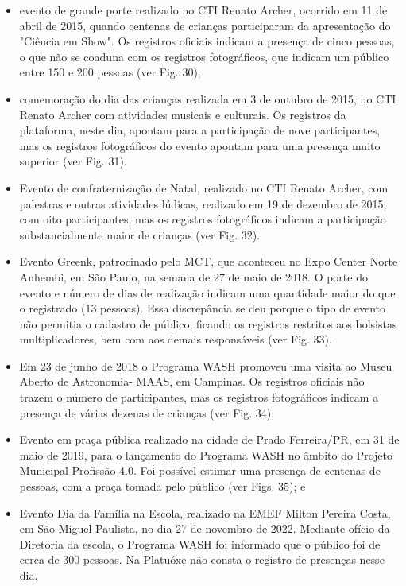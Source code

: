 \begin{itemize}
\item evento de grande porte realizado no CTI Renato Archer, ocorrido em 11 de abril de 2015, quando centenas de crianças participaram da apresentação do "Ciência em Show". Os registros oficiais indicam a presença de cinco pessoas, o que não se coaduna com os registros fotográficos, que indicam um público entre 150 e 200 pessoas (ver Fig. 30);
\item comemoração do dia das crianças realizada em 3 de outubro de 2015, no CTI Renato Archer com atividades musicais e culturais. Os registros da plataforma, neste dia, apontam para a participação de nove participantes, mas os registros fotográficos do evento apontam para uma presença muito superior (ver Fig. 31).
\item Evento de confraternização de Natal, realizado no CTI Renato Archer, com palestras e outras atividades lúdicas, realizado em 19 de dezembro de 2015, com oito participantes, mas os registros fotográficos indicam a participação substancialmente maior de crianças (ver Fig. 32).
\item Evento Greenk, patrocinado pelo MCT, que aconteceu no Expo Center Norte Anhembi, em São Paulo, na semana de 27 de maio de 2018. O porte do evento e número de dias de realização indicam uma quantidade  maior do que o registrado (13 pessoas). Essa discrepância se deu porque o tipo de evento não permitia o cadastro de público, ficando os registros restritos aos bolsistas multiplicadores, bem com aos demais responsáveis (ver Fig. 33).
\item Em 23 de junho de 2018 o Programa WASH promoveu uma visita ao Museu Aberto de Astronomia- MAAS, em Campinas. Os registros oficiais não trazem o número de participantes, mas os registros fotográficos indicam a presença de várias dezenas de crianças (ver Fig. 34);
\item Evento em praça pública realizado na cidade de Prado Ferreira/PR, em 31 de maio de 2019, para o lançamento do Programa WASH no âmbito do Projeto Municipal Profissão 4.0. Foi possível estimar uma presença de centenas de pessoas, com a praça tomada pelo público (ver Figs. 35); e
\item Evento Dia da Família na Escola, realizado na EMEF Milton Pereira Costa, em São Miguel Paulista, no dia 27 de novembro de 2022. Mediante ofício da Diretoria da escola, o Programa WASH foi informado que o público foi de cerca de 300 pessoas. Na Platuóxe não consta o registro de presenças nesse dia.
\end{itemize}



